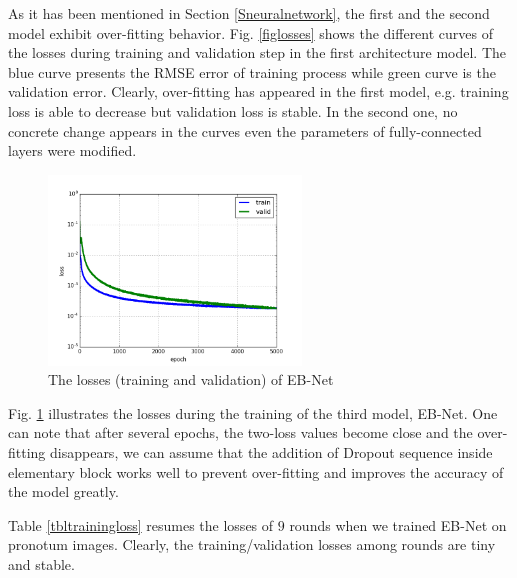 \documentclass[review]{elsarticle}
\begin{document}
As it has been mentioned in Section \ref{Sneuralnetwork}, the first
and the second model exhibit over-fitting
behavior. Fig. \ref{figlosses} shows the different curves of the
losses during training and validation step in the first architecture model. The blue curve presents
the RMSE error of training process while green curve is the
validation error. Clearly, over-fitting has appeared in the first
model, e.g. training loss is able to decrease but validation
loss is stable. In the second one, no concrete change appears in the curves even the parameters of fully-connected layers were modified.

\begin{figure}[h!]
    \centering
    \includegraphics[width=0.6\textwidth]{images/model3_loss}
    \caption{The losses (training and validation) of EB-Net}
    \label{figloss3}
\end{figure}

Fig. \ref{figloss3} illustrates the losses during the training of the
third model, EB-Net. One can note that after several epochs, the
two-loss values become close and the over-fitting disappears, we can
assume that the addition of Dropout sequence inside elementary block works well to prevent over-fitting and improves the accuracy of the model greatly.

Table \ref{tbltrainingloss} resumes the losses of $9$ rounds when we
trained EB-Net on pronotum images. Clearly, the training/validation
losses among rounds are tiny and stable.
\end{document}
